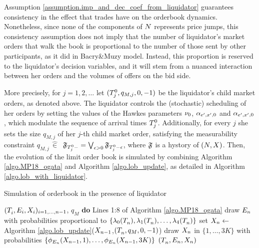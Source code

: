 \documentclass[10pt, article,table]{article}
\begin{document}
Assumption \ref{assumption.imp_and_dec_coef_from_liquidator} guarantees consistency in the effect that trades have on the orderbook dynamics. Nonetheless, since none of the components of $\multiCountingProc$ represents price jumps, this consistency assumption does not imply that the number of liquidator's market orders that  walk the book  is proportional to the number of those sent by other participants, as it did in Bacry\&Muzy model. Instead, this proportion is reserved to the liquidator's decision variables, and it will stem from a nuanced interaction between her orders and the volumes of offers on the bid side. 

More precisely, for $j=1,2,\dots$ let $(\arrivalTimes[0]_j, q_{M,j},0,-1)$ be the liquidator's child market orders, as denoted above. The liquidator controls the (stochastic) scheduling of her orders by setting the values of the Hawkes parameters $\baseRate_0$, $\impCoef_{\eone,\xone,0}$ and $\impCoef_{\eone,\xone,0}$, which modulate the sequence of arrival times $\arrivalTimes[0]_j$. Additionally, for every $j$ she sets the size $q_{M,j}$ of her $j$-th child market order, satisfying the measurability constraint $q_{M,j} \, \hat{\in} \, $ $ \filtrationF_{\arrivalTimes[0]_j -} = \bigvee_{\epsilon>0}\filtrationF_{\arrivalTimes[0]_j -\epsilon}$, where $\filtrationF$ is a hystory of $(\multiCountingProc,\stateVariable)$.  Then, the evolution of the limit order book is simulated by combining Algorithm \ref{algo.MP18_ogata} and Algorithm \ref{algo.lob_update}, as detailed in Algorithm \ref{algo.lob_with_liquidator}.

\begin{algorithm}[h]
\caption{Simulation of orderbook in the presence of liquidator}
\label{algo.lob_with_liquidator}
 \begin{algorithmic}[5]
  \REQUIRE $(\arrivalTimes[]_i,\event[i],\stateVariable_i)_{i=1,\dots,n-1}$, $q_M$
  \STATE \textbf{do} Lines 1:8 of Algorithm \ref{algo.MP18_ogata}
  \STATE draw $\event[n]$ with probabilities proportional to $\lbrace \intensity[0](\arrivalTimes[]_n),\intensity[1](\arrivalTimes[]_n),\dots,\intensity[4](\arrivalTimes[]_n)\rbrace$
  \STATE set $\stateVariable_n \leftarrow$ Algorithm \ref{algo.lob_update}($\stateVariable_{n-1}$,$(\arrivalTimes[]_n,q_M,0,-1)$)
  \ELSE
  \STATE draw $\stateVariable_n$ in $\lbrace 1,\dots,3K\rbrace$ with probabilities $\lbrace \transProb_{\event}(\stateVariable_{n-1},1), \dots,\transProb_{\event}(\stateVariable_{n-1},3K)\rbrace$
  \ENDIF
  \RETURN $(\arrivalTimes[]_n,\event[n],\stateVariable_n)$
 \end{algorithmic}
\end{algorithm}
\end{document}
